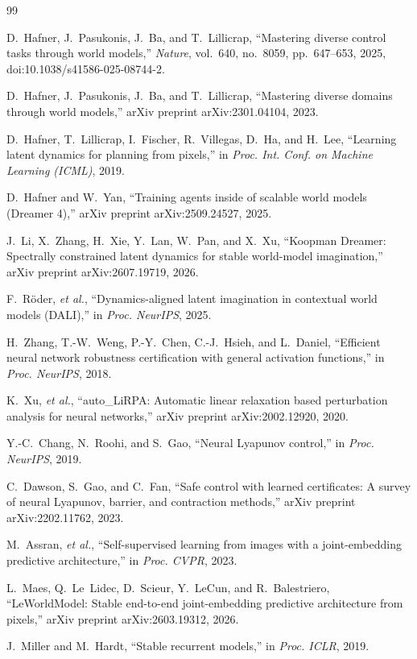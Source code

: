 \documentclass[journal]{IEEEtran}
\begin{document}
\begin{thebibliography}{99}

D.~Hafner, J.~Pasukonis, J.~Ba, and T.~Lillicrap,
``Mastering diverse control tasks through world models,''
\emph{Nature}, vol.~640, no.~8059, pp.~647--653, 2025,
doi:10.1038/s41586-025-08744-2.

D.~Hafner, J.~Pasukonis, J.~Ba, and T.~Lillicrap,
``Mastering diverse domains through world models,''
arXiv preprint arXiv:2301.04104, 2023.

D.~Hafner, T.~Lillicrap, I.~Fischer, R.~Villegas, D.~Ha, and H.~Lee,
``Learning latent dynamics for planning from pixels,''
in \emph{Proc. Int. Conf. on Machine Learning (ICML)}, 2019.

D.~Hafner and W.~Yan,
``Training agents inside of scalable world models (Dreamer 4),''
arXiv preprint arXiv:2509.24527, 2025.

J.~Li, X.~Zhang, H.~Xie, Y.~Lan, W.~Pan, and X.~Xu,
``Koopman Dreamer: Spectrally constrained latent dynamics for stable
world-model imagination,''
arXiv preprint arXiv:2607.19719, 2026.

F.~R\"oder, \emph{et al.},
``Dynamics-aligned latent imagination in contextual world models (DALI),''
in \emph{Proc. NeurIPS}, 2025.

H.~Zhang, T.-W.~Weng, P.-Y.~Chen, C.-J.~Hsieh, and L.~Daniel,
``Efficient neural network robustness certification with general activation
functions,''
in \emph{Proc. NeurIPS}, 2018.

K.~Xu, \emph{et al.},
``auto\_LiRPA: Automatic linear relaxation based perturbation analysis for
neural networks,''
arXiv preprint arXiv:2002.12920, 2020.

Y.-C.~Chang, N.~Roohi, and S.~Gao,
``Neural Lyapunov control,''
in \emph{Proc. NeurIPS}, 2019.

C.~Dawson, S.~Gao, and C.~Fan,
``Safe control with learned certificates: A survey of neural Lyapunov,
barrier, and contraction methods,''
arXiv preprint arXiv:2202.11762, 2023.

M.~Assran, \emph{et al.},
``Self-supervised learning from images with a joint-embedding predictive
architecture,''
in \emph{Proc. CVPR}, 2023.

L.~Maes, Q.~Le~Lidec, D.~Scieur, Y.~LeCun, and R.~Balestriero,
``LeWorldModel: Stable end-to-end joint-embedding predictive architecture
from pixels,''
arXiv preprint arXiv:2603.19312, 2026.

J.~Miller and M.~Hardt,
``Stable recurrent models,''
in \emph{Proc. ICLR}, 2019.

\end{thebibliography}
\end{document}
